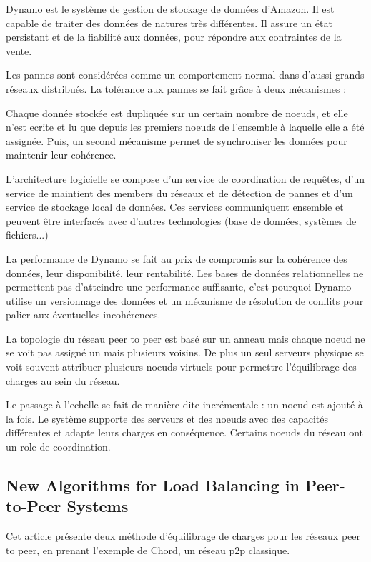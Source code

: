 \documentclass{article}
\begin{document}
Dynamo est le système de gestion de stockage de données d'Amazon. Il est capable de traiter des données de natures
très différentes. Il assure un état persistant et de la fiabilité aux données, pour répondre aux contraintes de la
vente.

Les pannes sont considérées comme un comportement normal dans d'aussi grands réseaux distribués. La tolérance aux pannes se fait grâce à deux mécanismes :

Chaque donnée stockée est dupliquée sur un certain nombre de noeuds, et elle n'est ecrite et lu que depuis
les premiers noeuds de l'ensemble à laquelle elle a été assignée. Puis, un second mécanisme permet de synchroniser
les données pour maintenir leur cohérence.

L'architecture logicielle se compose d'un service de coordination de requêtes, d'un service de maintient des members du réseaux et de détection de pannes et d'un service de stockage local de données. Ces services communiquent ensemble et peuvent être interfacés avec d'autres technologies (base de données, systèmes de fichiers...)

La performance de Dynamo se fait au prix de compromis sur la cohérence des données, leur disponibilité,
leur rentabilité. Les bases de données relationnelles ne permettent pas d'atteindre une performance suffisante,
c'est pourquoi Dynamo utilise un versionnage des données et un mécanisme de résolution de conflits pour palier aux éventuelles incohérences.

La topologie du réseau peer to peer est basé sur un anneau mais chaque noeud ne se voit pas assigné un mais plusieurs
voisins. De plus un seul serveurs physique se voit souvent attribuer plusieurs noeuds virtuels pour permettre l'équilibrage
des charges au sein du réseau.

Le passage à l'echelle se fait de manière dite incrémentale : un noeud est ajouté à la fois.
Le système supporte des serveurs et des noeuds avec des capacités différentes et adapte leurs charges en conséquence. Certains noeuds du réseau ont un role de coordination.


\subsection{New Algorithms for Load Balancing in Peer-to-Peer Systems\cite{karger2003new}}
Cet article présente deux méthode d'équilibrage de charges pour les réseaux peer to peer, en prenant l'exemple de
Chord, un réseau p2p classique.
\end{document}
